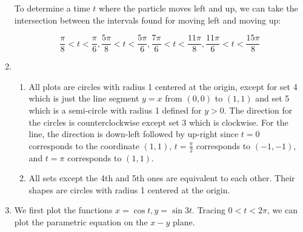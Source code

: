 \begin{enumerate}
        To determine a time $t$ where the particle moves left and up, we can take the intersection between the intervals found for moving left and moving up:
        
        \[
            \frac{\pi}{8} < t < \frac{\pi}{6}, \frac{5\pi}{8} < t < \frac{5\pi}{6}, \frac{7\pi}{6} < t < \frac{11\pi}{8}, \frac{11\pi}{6} < t < \frac{15\pi}{8}
        \]

    \item 
    \begin{enumerate}
        \item All plots are circles with radius 1 centered at the origin, except for set 4 which is just the line segment $y=x$ from $(0,0)$ to $(1,1)$ and set 5 which is a semi-circle with radius 1 defined for $y > 0$. The direction for the circles is counterclockwise except set 3 which is clockwise. For the line, the direction is down-left followed by up-right since $t=0$ corresponds to the coordinate $(1,1)$, $t=\frac{\pi}{2}$ corresponds to $(-1,-1)$, and $t=\pi$ corresponds to $(1,1)$.

        \item All sets except the 4th and 5th ones are equivalent to each other. Their shapes are circles with radius 1 centered at the origin.
    \end{enumerate}

    \item
    We first plot the functions $x=\cos{t}, y=\sin{3t}$. Tracing $0 < t < 2\pi$, we can plot the parametric equation on the $x-y$ plane.
	
	    \begin{figure}[!ht]
	    \centering
    
    

\end{figure}
\end{enumerate}
